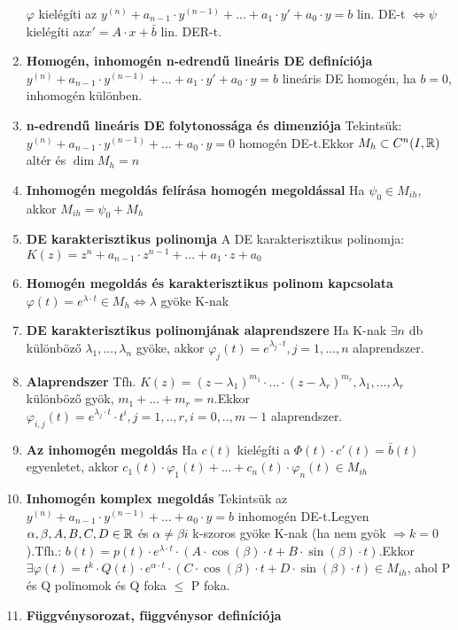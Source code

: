 \documentclass{article}
\begin{document}
\begin{enumerate}
	$\varphi$ kielégíti az $y^{(n)}+a_{n-1}\cdot y^{(n-1)}+...+a_1\cdot y'+a_0\cdot y=b$
	lin. DE-t $\Leftrightarrow\psi$ kielégíti az\br$x'=A\cdot x+\bar{b}$ lin. DER-t.
	\item\textbf{Homogén, inhomogén n-edrendű lineáris DE definíciója}\br
	$y^{(n)}+a_{n-1}\cdot y^{(n-1)}+...+a_1\cdot y'+a_0\cdot y = b$ lineáris DE
	homogén, ha $b=0$, inhomogén különben.
	\item\textbf{n-edrendű lineáris DE folytonossága és dimenziója}\br
	Tekintsük: $y^{(n)}+a_{n-1}\cdot y^{(n-1)}+...+a_0\cdot y=0$
	homogén DE-t.\br Ekkor $M_h\subset C^n (I, \mathbb{R})$ altér és $\dim M_h=n$
	\item\textbf{Inhomogén megoldás felírása homogén megoldással}\br
	Ha $\psi_0\in M_{ih}$, akkor $M_{ih}=\psi_0+M_h$
	\item\textbf{DE karakterisztikus polinomja}\br
	A DE karakterisztikus polinomja: $K(z)=z^n+a_{n-1}\cdot z^{n-1}+...+a_1
	\cdot z+a_0$
	\item\textbf{Homogén megoldás és karakterisztikus polinom kapcsolata}\br
	$\varphi(t)=e^{\lambda\cdot t}\in M_h \Leftrightarrow\lambda$ gyöke K-nak
	\item\textbf{DE karakterisztikus polinomjának alaprendszere}\br
	Ha K-nak $\exists n$ db különböző $\lambda_1, ... , \lambda_n$ gyöke, akkor
	$\varphi_{j}(t)=e^{\lambda_j\cdot t},j=1,...,n$ alaprendszer.
	\item\textbf{Alaprendszer}\br
	Tfh. $K(z)=(z-\lambda_1)^{m_1}\cdot...\cdot(z-\lambda_r)^{m_r},\lambda_1,
	... ,\lambda_r$ különböző gyök, $m_1 + ... + m_r = n$.\br Ekkor
	$\varphi_{i,j}(t)=e^{\lambda_j\cdot t}\cdot t^i,j=1,..,r,i=0,..,m-1$
	alaprendszer.
	\item\textbf{Az inhomogén megoldás}\br
	Ha $c(t)$ kielégíti a $\Phi(t)\cdot c'(t) = \bar{b}(t)$ egyenletet, akkor
	$c_1(t)\cdot\varphi_1(t)+...+c_n(t)\cdot\varphi_n(t)\in M_{ih}$
	\item\textbf{Inhomogén komplex megoldás}\br
	Tekintsük az $y^{(n)}+a_{n-1}\cdot y^{(n-1)}+...+a_0\cdot y=b$ inhomogén
	DE-t.\br Legyen $\alpha,\beta,A,B,C,D\in\mathbb{R}$ és $\alpha\neq\beta i$ k-szoros
	gyöke K-nak (ha nem gyök $\Rightarrow k=0$).\br Tfh.: $b(t)=p(t)\cdot
	e^{\lambda\cdot t}\cdot(A\cdot \cos(\beta)\cdot t+B\cdot\sin(\beta)
	\cdot t).$\br Ekkor $\exists\varphi(t)=t^k\cdot Q(t)\cdot e^{\alpha\cdot t}
	\cdot(C\cdot\cos(\beta)\cdot t+D\cdot\sin(\beta)\cdot t)\in M_{ih}$,
	\br ahol P és Q polinomok és Q foka $\leq$ P foka.
	\newpage
	\item\textbf{Függvénysorozat, függvénysor definíciója}
	\begin{itemize}

\end{itemize}
\end{enumerate}
\end{document}
